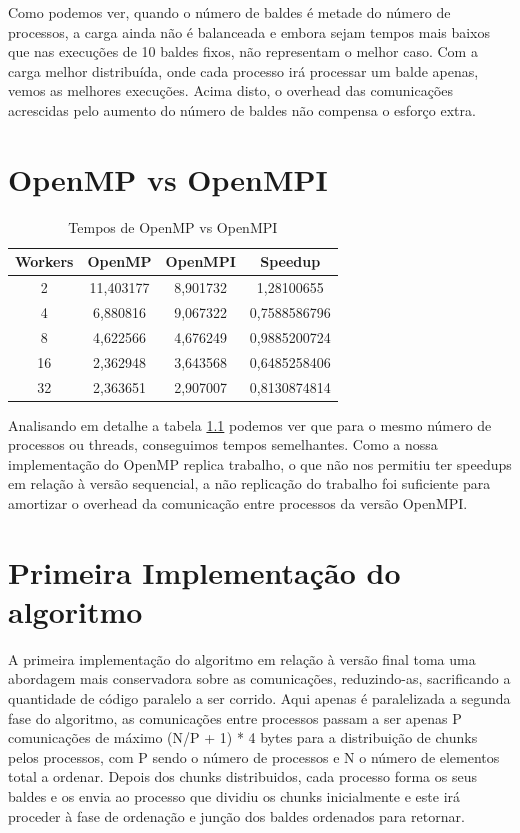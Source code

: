 \documentclass[a4paper]{report}
\begin{document}
Como podemos ver, quando o número de baldes é metade do número de processos, a
carga ainda não é balanceada e embora sejam tempos mais baixos que nas execuções
de 10 baldes fixos, não representam o melhor caso. Com a carga melhor
distribuída, onde cada processo irá processar um balde apenas, vemos as melhores
execuções. Acima disto, o overhead das comunicações acrescidas pelo aumento do
número de baldes não compensa o esforço extra.

\appendix

\chapter{OpenMP vs OpenMPI}
\begin{table}[h]
    \centering
    \begin{tabular}{|c|c|c|c|}
        \hline
        Workers & OpenMP    & OpenMPI  & Speedup      \\ \hline
        2       & 11,403177 & 8,901732 & 1,28100655   \\ \hline
        4       & 6,880816  & 9,067322 & 0,7588586796 \\ \hline
        8       & 4,622566  & 4,676249 & 0,9885200724 \\ \hline
        16      & 2,362948  & 3,643568 & 0,6485258406 \\ \hline
        32      & 2,363651  & 2,907007 & 0,8130874814 \\ \hline
    \end{tabular}
    \caption{Tempos de OpenMP vs OpenMPI}
    \label{tab:ompi}
\end{table}

Analisando em detalhe a tabela \ref{tab:ompi} podemos ver que para o mesmo
número de processos ou threads, conseguimos tempos semelhantes. Como a nossa
implementação do OpenMP replica trabalho, o que não nos permitiu ter speedups em
relação à versão sequencial, a não replicação do trabalho foi suficiente para
amortizar o overhead da comunicação entre processos da versão OpenMPI.

\chapter{Primeira Implementação do algoritmo} \label{apx:slowpar}

A primeira implementação do algoritmo em relação à versão final toma uma
abordagem mais conservadora sobre as comunicações, reduzindo-as, sacrificando a
quantidade de código paralelo a ser corrido. Aqui apenas é paralelizada a
segunda fase do algoritmo, as comunicações entre processos passam a ser apenas P
comunicações de máximo (N/P + 1) * 4 bytes para a distribuição de chunks pelos
processos, com P sendo o número de processos e N o número de elementos total a
ordenar. Depois dos chunks distribuidos, cada processo forma os seus baldes e os
envia ao processo que dividiu os chunks inicialmente e este irá proceder à fase
de ordenação e junção dos baldes ordenados para retornar.
\end{document}
